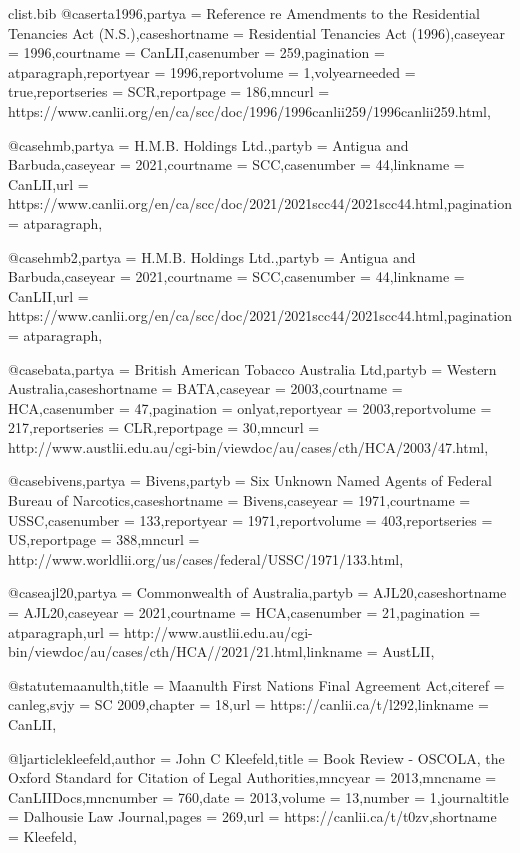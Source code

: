 \begin{filecontents*}[overwrite]{clist\jobname.bib}
@case{rta1996,partya =  {Reference re Amendments to the Residential Tenancies Act (N.S.)},caseshortname =  {Residential Tenancies Act (1996)},caseyear =  {1996},courtname =  {CanLII},casenumber =  {259},pagination =  {atparagraph},reportyear =  {1996},reportvolume =  {1},volyearneeded =  {true},reportseries =  {SCR},reportpage =  {186},mncurl =  {https://www.canlii.org/en/ca/scc/doc/1996/1996canlii259/1996canlii259.html},}

@case{hmb,partya = {H.M.B. Holdings Ltd.},partyb = {Antigua and Barbuda},caseyear = {2021},courtname = {SCC},casenumber = {44},linkname = {CanLII},url = {https://www.canlii.org/en/ca/scc/doc/2021/2021scc44/2021scc44.html},pagination = {atparagraph},}

@case{hmb2,partya = {H.M.B. Holdings Ltd.\@},partyb = {Antigua and Barbuda},caseyear = {2021},courtname = {SCC},casenumber = {44},linkname = {CanLII},url = {https://www.canlii.org/en/ca/scc/doc/2021/2021scc44/2021scc44.html},pagination = {atparagraph},}


@case{bata,partya =  {British American Tobacco Australia Ltd},partyb =  {Western Australia},caseshortname =  {BATA},caseyear =  {2003},courtname =  {HCA},casenumber =  {47},pagination =  {onlyat},reportyear =  {2003},reportvolume =  {217},reportseries =  {CLR},reportpage =  {30},mncurl =  {http://www.austlii.edu.au/cgi-bin/viewdoc/au/cases/cth/HCA/2003/47.html},}

@case{bivens,partya =  {Bivens},partyb =  {Six Unknown Named Agents of Federal Bureau of Narcotics},caseshortname =  {Bivens},caseyear =  {1971},courtname =  {USSC},casenumber =  {133},reportyear =  {1971},reportvolume =  {403},reportseries =  {US},reportpage =  {388},mncurl =  {http://www.worldlii.org/us/cases/federal/USSC/1971/133.html},}

@case{ajl20,partya =  {Commonwealth of Australia},partyb =  {AJL20},caseshortname =  {AJL20},caseyear =  {2021},courtname =  {HCA},casenumber =  {21},pagination =  {atparagraph},url =  {http://www.austlii.edu.au/cgi-bin/viewdoc/au/cases/cth/HCA//2021/21.html},linkname =  {AustLII},}

@statute{maanulth,title =  {Maanulth First Nations Final Agreement Act},citeref =  {canleg},svjy =  {SC 2009},chapter =  {18},url =  {https://canlii.ca/t/l292},linkname =  {CanLII},}

@ljarticle{kleefeld,author =  {John C Kleefeld},title =  {Book Review - OSCOLA, the Oxford Standard for Citation of Legal Authorities},mncyear =  {2013},mncname =  {CanLIIDocs},mncnumber =  {760},date =  {2013},volume =  {13},number =  {1},journaltitle =  {Dalhousie Law Journal},pages =  {269},url =  {https://canlii.ca/t/t0zv},shortname =  {Kleefeld},}


\end{filecontents*}

